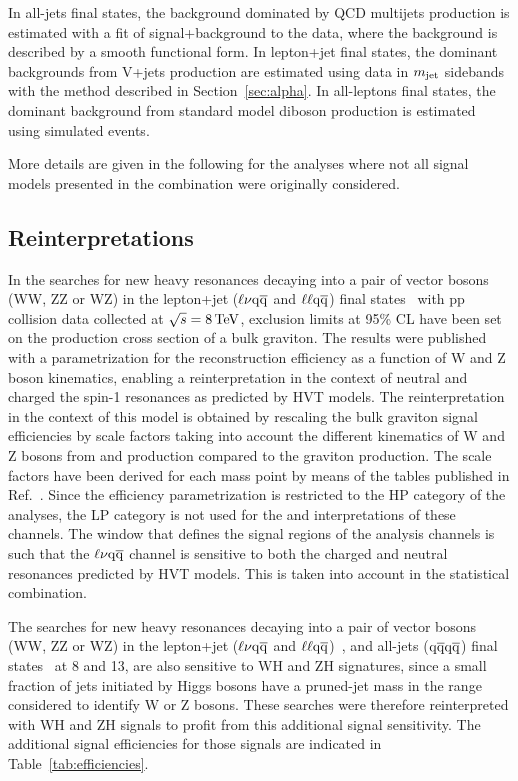 In all-jets final states, the background dominated by QCD multijets production is estimated with a fit of signal+background to the data, where the background is described by a smooth functional form.
In lepton+jet final states, the dominant backgrounds from V+jets production are estimated using data in $m_{\text{jet}}$ sidebands with the method described in Section~\ref{sec:alpha}.
In all-leptons final states, the dominant background from standard model diboson production is estimated using simulated events.

More details are given in the following for the analyses where not all signal models presented in the combination were originally considered.

\subsection{Reinterpretations}

In the searches for new heavy resonances decaying into a pair of vector bosons (WW, ZZ or WZ) in the lepton+jet ($\ell \nu \mathrm{q}\overline{\mathrm{q}}$ and $\ell\ell \mathrm{q}\overline{\mathrm{q}}$) final states~\cite{Khachatryan:2014gha} with pp collision data collected at $\sqrt{s} = 8\,\text{Te\hspace{-.08em}V}$, exclusion limits at 95\% CL have been set on the production cross section of a bulk graviton.
The results were published with a parametrization for the reconstruction efficiency as a function of W and Z boson kinematics, enabling a reinterpretation in the context of neutral and charged the spin-1 resonances as predicted by HVT models.
The reinterpretation in the context of this model is obtained by rescaling the bulk graviton signal efficiencies by scale factors taking into account the different kinematics of W and Z bosons from \PWpr{} and \cPZpr{} production compared to the graviton production.
The scale factors have been derived for each mass point by means of the tables published in Ref.~\cite{Khachatryan:2014gha}.
Since the efficiency parametrization is restricted to the HP category of the analyses, the LP category is not used for the \PWpr{} and \cPZpr{} interpretations of these channels.
The \mJ window that defines the signal regions of the analysis channels is such that the $\ell \nu \mathrm{q}\overline{\mathrm{q}}$ channel is sensitive to both the charged and neutral resonances predicted by HVT models. This is taken into account in the statistical combination.

The searches for new heavy resonances decaying into a pair of vector bosons (WW, ZZ or WZ) in the lepton+jet ($\ell \nu \mathrm{q}\overline{\mathrm{q}}$ and $\ell\ell \mathrm{q}\overline{\mathrm{q}}$)~\cite{Khachatryan:2014gha,Khachatryan:2014gha,CMS-PAS-EXO-15-002}, and all-jets ($\mathrm{q}\overline{\mathrm{q}} \mathrm{q}\overline{\mathrm{q}}$) final states~\cite{Khachatryan:2014hpa,CMS-PAS-EXO-15-002} at 8 and 13\TeV, are also sensitive to WH and ZH signatures, since a small fraction of jets initiated by Higgs bosons have a pruned-jet mass in the range considered to identify W or Z bosons.
These searches were therefore reinterpreted with WH and ZH signals to profit from this additional signal sensitivity.
The additional signal efficiencies for those signals are indicated in Table~\ref{tab:efficiencies}.

